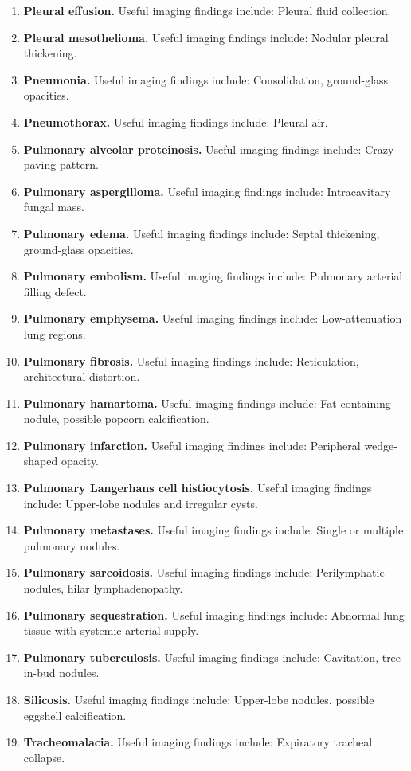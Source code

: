 \begin{enumerate}[leftmargin=*,itemsep=0.45em,topsep=0.4em]
\item \textbf{Pleural effusion.} Useful imaging findings include: Pleural fluid collection.
\item \textbf{Pleural mesothelioma.} Useful imaging findings include: Nodular pleural thickening.
\item \textbf{Pneumonia.} Useful imaging findings include: Consolidation, ground-glass opacities.
\item \textbf{Pneumothorax.} Useful imaging findings include: Pleural air.
\item \textbf{Pulmonary alveolar proteinosis.} Useful imaging findings include: Crazy-paving pattern.
\item \textbf{Pulmonary aspergilloma.} Useful imaging findings include: Intracavitary fungal mass.
\item \textbf{Pulmonary edema.} Useful imaging findings include: Septal thickening, ground-glass opacities.
\item \textbf{Pulmonary embolism.} Useful imaging findings include: Pulmonary arterial filling defect.
\item \textbf{Pulmonary emphysema.} Useful imaging findings include: Low-attenuation lung regions.
\item \textbf{Pulmonary fibrosis.} Useful imaging findings include: Reticulation, architectural distortion.
\item \textbf{Pulmonary hamartoma.} Useful imaging findings include: Fat-containing nodule, possible popcorn calcification.
\item \textbf{Pulmonary infarction.} Useful imaging findings include: Peripheral wedge-shaped opacity.
\item \textbf{Pulmonary Langerhans cell histiocytosis.} Useful imaging findings include: Upper-lobe nodules and irregular cysts.
\item \textbf{Pulmonary metastases.} Useful imaging findings include: Single or multiple pulmonary nodules.
\item \textbf{Pulmonary sarcoidosis.} Useful imaging findings include: Perilymphatic nodules, hilar lymphadenopathy.
\item \textbf{Pulmonary sequestration.} Useful imaging findings include: Abnormal lung tissue with systemic arterial supply.
\item \textbf{Pulmonary tuberculosis.} Useful imaging findings include: Cavitation, tree-in-bud nodules.
\item \textbf{Silicosis.} Useful imaging findings include: Upper-lobe nodules, possible eggshell calcification.
\item \textbf{Tracheomalacia.} Useful imaging findings include: Expiratory tracheal collapse.
\end{enumerate}

